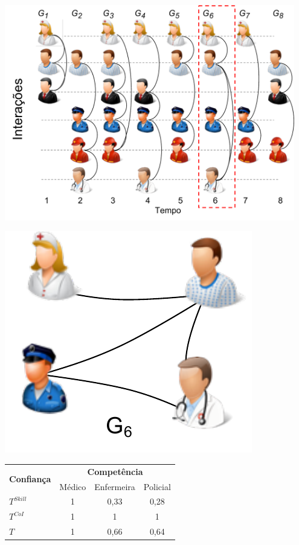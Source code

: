 \documentclass[12pt]{article}
\begin{document}
\begin{table}[!htb]
	\begin{minipage}[t]{0.5\linewidth}
		\includegraphics[width=0.95\textwidth]{figures/interacoes_t6.pdf}
		\label{fig:interacoesnotempo}
	\end{minipage}
	\begin{minipage}[b]{0.5\linewidth}
		\centering
		\includegraphics[width=.3\textwidth]{figures/Grafo6.pdf}
		\vspace{-0.2cm}
	    \label{fig:grafo6}
        \label{tab:exemploConfianca2}
        {
            \begin{tabular}{|l|ccc|}
            \hline%
            \multirow{2}{*}{\textbf{Confiança}}&\multicolumn{3}{c|}{\textbf{Competência}}  \\ \cline{2-4}
            &Médico&Enfermeira&Policial  \\ \hline
            \textbf{$T^{Skill}$}&1&0,33&0,28 \\
            \textbf{$T^{CoI}$}&1&1&1  \\
            \textbf{$T$}&1&0,66&0,64 \\
            \hline%
            \end{tabular}
        }
	\end{minipage}\hfill
\end{table}
\end{document}
